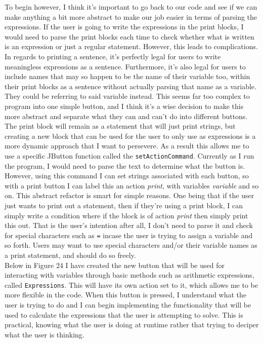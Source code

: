 \documentclass[a4paper, 12pt]{article}
\begin{document}
            To begin however, I think it's important to go back to our code and see if we can make anything
            a bit more abstract to make our job easier in terms of parsing the expressions. If the user is
            going to write the expressions in the print blocks, I would need to parse the print blocks each
            time to check whether what is written is an expression or just a regular statement. However,
            this leads to complications. In regards to printing a sentence, it's perfectly legal for
            users to write meaningless expressions as a sentence. Furthermore, it's also legal for users
            to include names that may so happen to be the name of their variable too, within their print
            blocks as a sentence without actually parsing that name as a variable. They could be referring
            to said variable instead. This seems far too complex to program into one simple button, and
            I think it's a wise decision to make this more abstract and separate what they can and can't do
            into different buttons. The print block will remain as a statement that will just print strings,
            but creating a new block that can be used for the user to only use as expressions is a more
            dynamic approach that I want to persevere. As a result this allows me to use a specific JButton
            function called the \texttt{setActionCommand}. Currently as I run the program, I would need to
            parse the text to determine what the button is. However, using this command I can set strings
            associated with each button, so with a print button I can label this an action \textit{print},
            with variables \textit{variable} and so on. This abstract refactor is smart for simple reasons.
            One being that if the user just wants to print out a statement, then if they're using a print
            block, I can simply write a condition where if the block is of action \textit{print} then simply
            print this out. That is the user's intention after all, I don't need to parse it and check for
            special characters such as \texttt{=} incase the user is trying to assign a variable and so forth.
            Users may want to use special characters and/or their variable names as a print statement, and
            should do so freely. \\

            Below in Figure 24 I have created the new button that will be used for interacting with variables
            through basic methods such as arithmetic expressions, called \texttt{Expressions}. This will
            have its own action set to it, which allows me to be more flexible in the code. When this
            button is pressed, I understand what the user is trying to do and I can begin implementing the
            functionality that will be used to calculate the expressions that the user is attempting to
            solve. This is practical, knowing what the user is doing at runtime rather that trying to
            deciper what the user is thinking.
            
\end{document}
